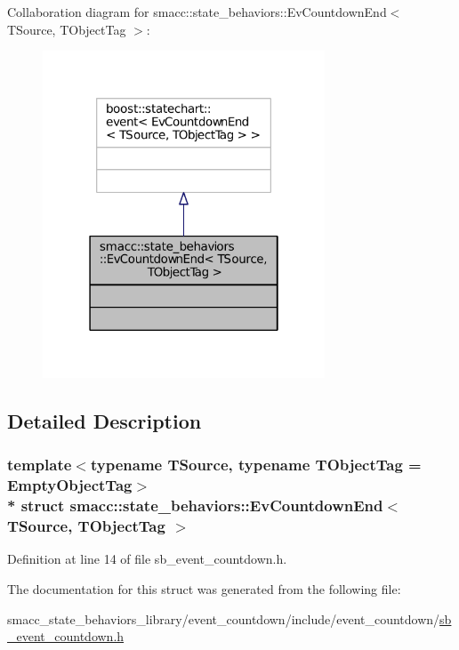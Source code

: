Collaboration diagram for smacc\+:\+:state\+\_\+behaviors\+:\+:Ev\+Countdown\+End$<$ T\+Source, T\+Object\+Tag $>$\+:
\nopagebreak
\begin{figure}[H]
\begin{center}
\leavevmode
\includegraphics[width=238pt]{structsmacc_1_1state__behaviors_1_1EvCountdownEnd__coll__graph}
\end{center}
\end{figure}


\subsection{Detailed Description}
\subsubsection*{template$<$typename T\+Source, typename T\+Object\+Tag = Empty\+Object\+Tag$>$\\*
struct smacc\+::state\+\_\+behaviors\+::\+Ev\+Countdown\+End$<$ T\+Source, T\+Object\+Tag $>$}



Definition at line 14 of file sb\+\_\+event\+\_\+countdown.\+h.



The documentation for this struct was generated from the following file\+:\begin{DoxyCompactItemize}
\item 
smacc\+\_\+state\+\_\+behaviors\+\_\+library/event\+\_\+countdown/include/event\+\_\+countdown/\hyperlink{sb__event__countdown_8h}{sb\+\_\+event\+\_\+countdown.\+h}\end{DoxyCompactItemize}
